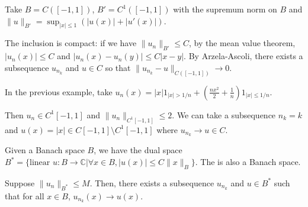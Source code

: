 \documentclass[12pt]{scrartcl}
\newcommand{\C}{\mathbb C}
\newcommand{\<}{\langle}
\renewcommand{\>}{\rangle}
\begin{document}
\begin{example} Take $B = C([-1, 1])$, $B' = C^1([-1, 1])$ with the supremum norm on $B$ and $\|u\|_{B'} = \sup_{|x| \le 1} (|u(x)| + |u'(x)|)$.

The inclusion is compact: if we have $\|u_n\|_{B'} \le C$, by the mean value theorem, $|u_n(x)| \le C$ and $|u_n(x) - u_{n}(y)| \le C|x - y|$.  By Arzela-Ascoli, there exists a subsequence $u_{n_k}$ and $u \in C$ so that $\|u_{n_k} - u\|_{C([-1, 1])} \to 0$.
\end{example}
\begin{example} In the previous example, take $u_n(x) = |x|1_{|x| > 1/n} + (\frac{nx^2}{2} + \frac{1}{n})1_{|x| \le 1/n}$.

Then $u_n \in C^{1}[-1, 1]$ and $\|u_n\|_{C^1[-1, 1]} \le 2$.   We can take a subsequence $n_k = k$ and $u(x)= |x| \in C[-1, 1] \setminus C^1[-1, 1]$ where $u_{n_k} \to u \in C$.
\end{example}

Given a Banach space $B$, we have the dual space $B^* = \{\text{linear } u:  B \to \C | \forall x \in B, |u(x)| \le C \|x\|_B\}$.  The is also a Banach space.  

\begin{thm} Suppose $\|u_n\|_{B^*} \le M$.  Then, there exists a subsequence $u_{n_k}$ and $u \in B^*$ such that for all $x \in B$, $u_{n_k}(x) \to u(x)$.  
\end{thm}
\end{document}
